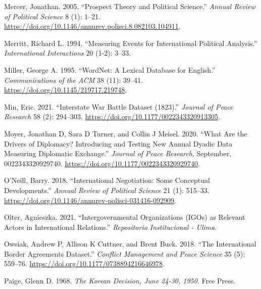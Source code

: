 \documentclass{article}
\newlength{\cslhangindent}
\newlength{\cslentryspacingunit} %
\newenvironment{CSLReferences}[2] %
 {%
  \setlength{\parindent}{0pt}
  \ifodd #1
  \let\oldpar\par
  \def\par{\hangindent=\cslhangindent\oldpar}
  \fi
  \setlength{\parskip}{#2\cslentryspacingunit}
 }%
 {}
\begin{document}
\begin{CSLReferences}{1}{0}
\leavevmode{}%
Mercer, Jonathan. 2005. {``Prospect {Theory} and {Political Science}.''}
\emph{Annual Review of Political Science} 8 (1): 1--21.
\url{https://doi.org/10.1146/annurev.polisci.8.082103.104911}.

\leavevmode{}%
Merritt, Richard L. 1994. {``Measuring Events for International
Political Analysis.''} \emph{International Interactions} 20 (1-2):
3--33.

\leavevmode{}%
Miller, George A. 1995. {``{WordNet}: A Lexical Database for
{English}.''} \emph{Communications of the ACM} 38 (11): 39--41.
\url{https://doi.org/10.1145/219717.219748}.

\leavevmode{}%
Min, Eric. 2021. {``Interstate {War Battle} Dataset
(1823).''} \emph{Journal of Peace Research} 58 (2):
294--303. \url{https://doi.org/10.1177/0022343320913305}.

\leavevmode{}%
Moyer, Jonathan D, Sara D Turner, and Collin J Meisel. 2020. {``What Are
the Drivers of Diplomacy? {Introducing} and Testing New Annual Dyadic
Data Measuring Diplomatic Exchange.''} \emph{Journal of Peace Research},
September, 0022343320929740.
\url{https://doi.org/10.1177/0022343320929740}.

\leavevmode{}%
O'Neill, Barry. 2018. {``International {Negotiation}: {Some Conceptual
Developments}.''} \emph{Annual Review of Political Science} 21 (1):
515--33. \url{https://doi.org/10.1146/annurev-polisci-031416-092909}.

\leavevmode{}%
Olter, Agnieszka. 2021. {``Intergovernmental Organizations ({IGOs}) as
Relevant Actors in {International Relations}.''} \emph{Repositorio
Institucional - Ulima}.

\leavevmode{}%
Owsiak, Andrew P, Allison K Cuttner, and Brent Buck. 2018. {``The
{International Border Agreements Dataset}.''} \emph{Conflict Management
and Peace Science} 35 (5): 559--76.
\url{https://doi.org/10.1177/0738894216646978}.

\leavevmode{}%
Paige, Glenn D. 1968. \emph{The {Korean Decision}, {June} 24-30, 1950}.
{Free Press}.


\end{CSLReferences}
\end{document}
